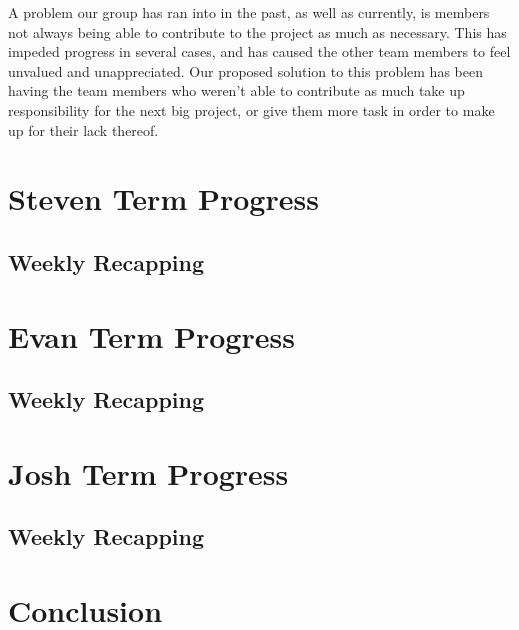 \documentclass[onecolumn, draftclsnofoot,10pt, compsoc]{IEEEtran}
\begin{document}
\noindent A problem our group has ran into in the past, as well as currently, is members not always being 
able to contribute to the project as much as necessary. This has impeded progress in several cases, and 
has caused the other team members to feel unvalued and unappreciated. Our proposed solution to this problem
has been having the team members who weren't able to contribute as much take up responsibility for the next
big project, or give them more task in order to make up for their lack thereof. \\

\newpage

\section{Steven Term Progress}

\subsection{Weekly Recapping}

\section{Evan Term Progress}

\subsection{Weekly Recapping}

\section{Josh Term Progress}
\subsection{Weekly Recapping}

\section{Conclusion}
\end{document}
